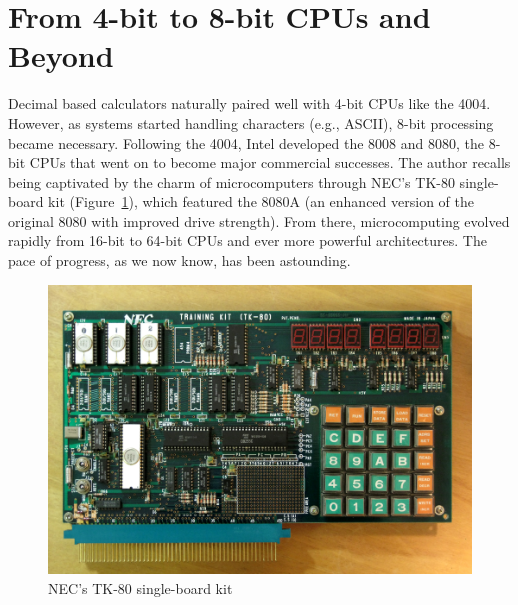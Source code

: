 \section{From 4-bit to 8-bit CPUs and Beyond}
Decimal based calculators naturally paired well with 4-bit CPUs like the 4004. However, as systems started handling characters (e.g., ASCII), 8-bit processing became necessary. Following the 4004, Intel developed the 8008 and 8080, the 8- bit CPUs that went on to become major commercial successes. The author recalls being captivated by the charm of microcomputers through NEC’s TK-80 single-board kit (Figure~\ref{fig:TK80}), which featured the 8080A (an enhanced version of the original 8080 with improved drive strength). From there, microcomputing evolved rapidly from 16-bit to 64-bit CPUs and ever more powerful architectures. The pace of progress, as we now know, has been astounding.

\begin{figure}
    \includegraphics[width=0.5\columnwidth]{./Figure/TK-80.png}
    \caption{NEC’s TK-80 single-board kit\protect\footnotemark[6]}
    \label{fig:TK80}
\end{figure}





